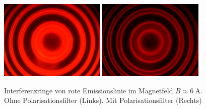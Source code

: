 	\begin{figure}[!ht]
	    \centering
	    \includegraphics[width=0.45\textwidth]{images/Capture_816.bmp.jpg}
	    \hspace{1em}
	    \includegraphics[width=0.45\textwidth]{images/Capture_815.bmp.jpg}
	    \caption{Interferenzringe von rote Emissionslinie im Magnetfeld $B \approx  \SI{6}{\ampere}$. Ohne Polarisationsfilter (Links). Mit Polarisationsfilter (Rechts)}
	    \label{fig:red-fringes-pol-B-big}
	    \vspace{-0.5em}
	\end{figure}
	\newpage
